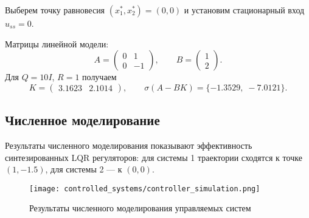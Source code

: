 Выберем точку равновесия $(x_1^*,x_2^*) = (0,0)$ и установим стационарный вход $u_{ss} = 0$.

Матрицы линейной модели:
\[
A = \begin{pmatrix} 0 & 1 \\ 0 & -1 \end{pmatrix},\qquad
B = \begin{pmatrix} 1 \\ 2 \end{pmatrix}.
\]
Для $Q=10I$, $R=1$ получаем
\[
K = \begin{pmatrix} 3.1623 & 2.1014 \end{pmatrix},\qquad
\sigma(A-BK) = \{-1.3529,\;-7.0121\}.
\]

\subsection*{Численное моделирование}

Результаты численного моделирования показывают эффективность синтезированных LQR регуляторов: для системы 1 траектории сходятся к точке $(1,-1.5)$, для системы 2 --- к $(0,0)$.

\begin{figure}[H]
\centering
\texttt{[image: controlled\_systems/controller\_simulation.png]}
\caption{Результаты численного моделирования управляемых систем}
\label{fig:controller_sim}
\end{figure}

